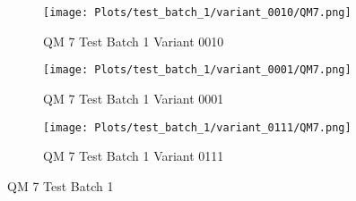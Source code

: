 \documentclass{DissertateFigs}
\begin{document}
\begin{figure}[t!]
\medskip

    \begin{subfigure}{0.47\textwidth}
    \texttt{[image: Plots/test\_batch\_1/variant\_0010/QM7.png]}
    \caption{QM 7 Test Batch 1 Variant 0010}
    \end{subfigure}
    \begin{subfigure}{0.47\textwidth}
    \texttt{[image: Plots/test\_batch\_1/variant\_0001/QM7.png]}
    \caption{QM 7 Test Batch 1 Variant 0001}
    \end{subfigure}

\medskip

    \begin{subfigure}{0.47\textwidth}
    \texttt{[image: Plots/test\_batch\_1/variant\_0111/QM7.png]}
    \caption{QM 7 Test Batch 1 Variant 0111}
    \end{subfigure}
\caption{QM 7 Test Batch 1}
    \end{figure}
\clearpage
\end{document}
